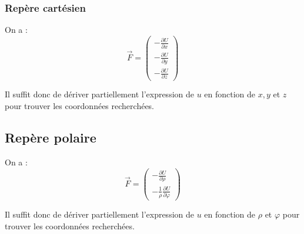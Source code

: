 \documentclass[french]{yLectureNote}
\renewcommand{\vec}{\overrightarrow}
\begin{document}
\subsubsection{Repère cartésien}
On a : \[\vec{F} =  \begin{pmatrix}
 -\frac{\partial U}{\partial x}\\
  -\frac{\partial U}{\partial y}\\
   -\frac{\partial U}{\partial z}
\end{pmatrix}\]

Il suffit donc de dériver partiellement l'expression de $u$ en fonction de $x,y$ et $z$ pour trouver les coordonnées recherchées.
\subsection{Repère polaire}
On a : \[\vec{F} =  \begin{pmatrix}
 -\frac{\partial U}{\partial \rho}\\
  -\frac{1}{\rho}\frac{\partial U}{\partial \varphi}
\end{pmatrix}\]

Il suffit donc de dériver partiellement l'expression de $u$ en fonction de $\rho$ et $\varphi$ pour trouver les coordonnées recherchées.
\end{document}
